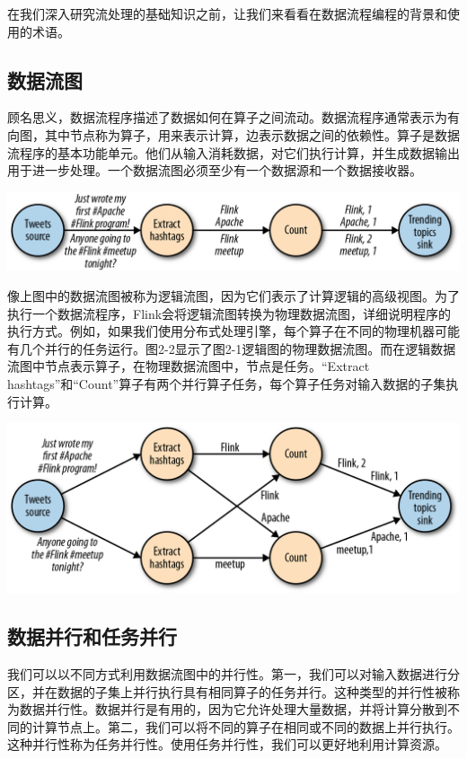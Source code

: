 \documentclass[cn,11pt,chinese]{elegantbook}
\begin{document}
在我们深入研究流处理的基础知识之前，让我们来看看在数据流程编程的背景和使用的术语。

\hypertarget{ux6570ux636eux6d41ux56fe}{%
\subsection{数据流图}\label{ux6570ux636eux6d41ux56fe}}

顾名思义，数据流程序描述了数据如何在算子之间流动。数据流程序通常表示为有向图，其中节点称为算子，用来表示计算，边表示数据之间的依赖性。算子是数据流程序的基本功能单元。他们从输入消耗数据，对它们执行计算，并生成数据输出用于进一步处理。一个数据流图必须至少有一个数据源和一个数据接收器。

\includegraphics{images/spaf_0201.png}

像上图中的数据流图被称为逻辑流图，因为它们表示了计算逻辑的高级视图。为了执行一个数据流程序，Flink会将逻辑流图转换为物理数据流图，详细说明程序的执行方式。例如，如果我们使用分布式处理引擎，每个算子在不同的物理机器可能有几个并行的任务运行。图2-2显示了图2-1逻辑图的物理数据流图。而在逻辑数据流图中节点表示算子，在物理数据流图中，节点是任务。``Extract
hashtags''和``Count''算子有两个并行算子任务，每个算子任务对输入数据的子集执行计算。

\includegraphics{images/spaf_0202.png}

\hypertarget{ux6570ux636eux5e76ux884cux548cux4efbux52a1ux5e76ux884c}{%
\subsection{数据并行和任务并行}\label{ux6570ux636eux5e76ux884cux548cux4efbux52a1ux5e76ux884c}}

我们可以以不同方式利用数据流图中的并行性。第一，我们可以对输入数据进行分区，并在数据的子集上并行执行具有相同算子的任务并行。这种类型的并行性被称为数据并行性。数据并行是有用的，因为它允许处理大量数据，并将计算分散到不同的计算节点上。第二，我们可以将不同的算子在相同或不同的数据上并行执行。这种并行性称为任务并行性。使用任务并行性，我们可以更好地利用计算资源。
\end{document}
